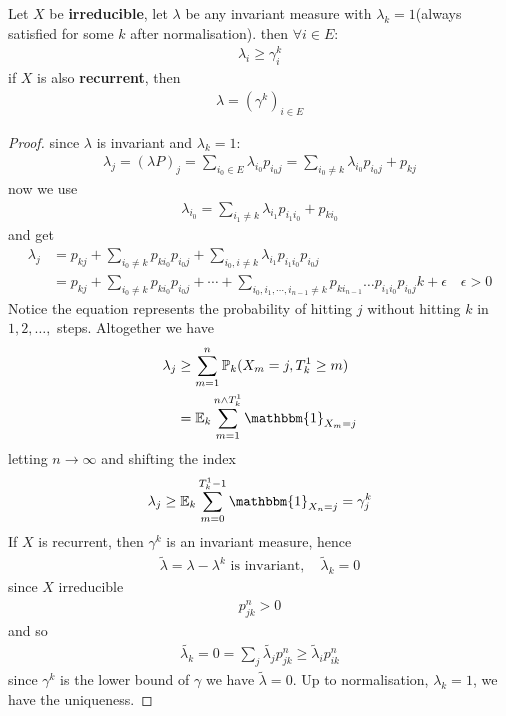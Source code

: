 \begin{theorem}
	Let $X$ be \textbf{irreducible}, let $\lambda$ be any invariant measure with $\lambda_k = 1$(always satisfied for some $k$ after normalisation).
	then $\forall i \in E$:
	\begin{align*}
		\lambda_i \geq \gamma_i^k 
	\end{align*}
	if $X$ is also \textbf{recurrent}, then
	\begin{align*}
		\lambda = (\gamma^k)_{i \in E}
	\end{align*}
\end{theorem}
\begin{proof}
	since $\lambda$ is invariant and $\lambda_k = 1$:
	\begin{align*}
		\lambda_j = (\lambda P)_j = \sum_{i_0 \in E} \lambda_{i_0} p_{i_0 j} 
		= \sum_{ i_0 \neq k} \lambda_{i_0} p_{i_0j} + p_{kj}
	\end{align*}
	now we use
	\begin{align*}
		\lambda_{i_0} = \sum_{ i_1 \neq k} \lambda_{i_1} p_{i_1 i_0} + p_{k i_0} 		
	\end{align*}
	and get
	\begin{align*}
		\lambda_j &= p_{kj} + \sum_{i_0 \neq k} p_{ki_0} p_{i_0 j} +  \sum_{i_0, i \neq k} \lambda_{i_1}p_{i_1i_0} p_{i_0 j} \\
		&= p_{kj} + \sum_{i_0 \neq k} p_{k i_0} p_{i_0 j} + \cdots + \sum_{i_0, i_1, \cdots, i_{n-1} \neq k}p_{k i_{n-1}} \dots p_{i_1i_0} p_{i_0 j} k + \epsilon \quad \epsilon>0
	\end{align*}
	Notice the equation represents the probability of hitting $j$ without hitting $k$ in $1, 2, \dots, $ steps. Altogether we have
	\begin{align*}
		\lambda_j &\geq \sum_{m = 1}^n \mathbb{P}_k(X_m = j, T_k^1 \geq m)\\
		&= \mathbb{E}_k \sum_{m = 1}^{n \wedge T_k^1}\mathbbm{1}_{X_m = j}
	\end{align*}
	letting $n \rightarrow \infty$ and shifting the index
	\begin{align*}
		\lambda_j \geq \mathbb{E}_k \sum_{m = 0}^{T_k^1 -1} \mathbbm{1}_{X_n = j} = \gamma_j^k
	\end{align*}
	If $X$ is recurrent, then $\gamma^k$ is an invariant measure, hence
	\begin{align*}
		\tilde{\lambda} = \lambda - \lambda^k \text{ is invariant}, \quad \tilde{\lambda}_k = 0
	\end{align*}
	since $X$ irreducible
	\begin{align*}
		p_{jk}^n  >0
	\end{align*}
	and so
	\begin{align*}
		\tilde{\lambda_k} = 0 = \sum_{j} \tilde{\lambda_j}p_{jk}^n \geq \tilde{\lambda}_i p_{ik}^n
	\end{align*}
	since $\gamma^k$ is the lower bound of $\gamma$ we have $\tilde{\lambda} = 0$.
	Up to normalisation, $\lambda_k= 1$, we have the uniqueness.
\end{proof}

